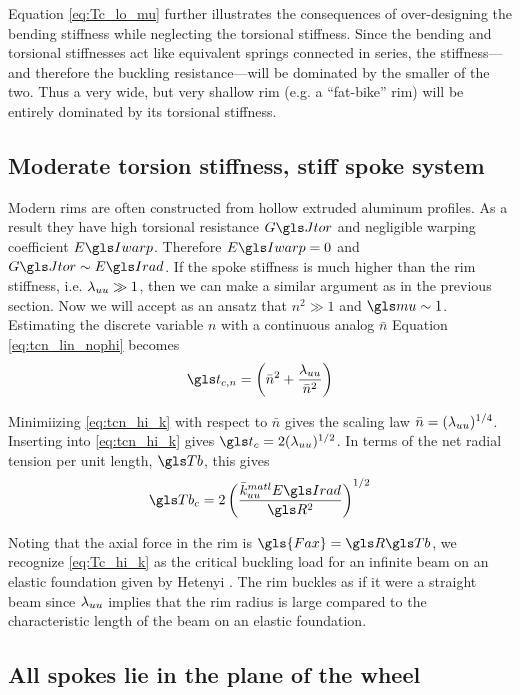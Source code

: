 \documentclass[\rootdir/thesis.tex]{subfiles}
\begin{document}
Equation \eqref{eq:Tc_lo_mu} further illustrates the consequences of over-designing the bending stiffness while neglecting the torsional stiffness. Since the bending and torsional stiffnesses act like equivalent springs connected in series, the stiffness---and therefore the buckling resistance---will be dominated by the smaller of the two. Thus a very wide, but very shallow rim (e.g. a ``fat-bike'' rim) will be entirely dominated by its torsional stiffness.

\subsection{Moderate torsion stiffness, stiff spoke system}
Modern rims are often constructed from hollow extruded aluminum profiles. As a result they have high torsional resistance $\GJ$ and negligible warping coefficient $\EIw$. Therefore $\EIw=0$ and $\GJ \sim \EIr$. If the spoke stiffness is much higher than the rim stiffness, i.e. $\lambda_{uu} \gg 1$, then we can make a similar argument as in the previous section. Now we will accept as an ansatz that $n^2 \gg 1$ and $\m \sim 1$. Estimating the discrete variable $n$ with a continuous analog $\bar{n}$ Equation \eqref{eq:tcn_lin_nophi} becomes
\begin{equation}
\label{eq:tcn_hi_k}
\ts_{c,n} = \left(\bar{n}^2 + \frac{\lr_{uu}}{\bar{n}^2}\right)
\end{equation}

Minimiizing \eqref{eq:tcn_hi_k} with respect to $\bar{n}$ gives the scaling law $\bar{n}=(\lambda_{uu})^{1/4}$. Inserting into \eqref{eq:tcn_hi_k} gives $\ts_c = 2(\lr_{uu})^{1/2}$. In terms of the net radial tension per unit length, $\Tb$, this gives
\begin{equation}
\label{eq:Tc_hi_k}
\Tb_c = 2 \left(\frac{\matl{\kuu}\EIr}{\R^2}\right)^{1/2}
\end{equation}

Noting that the axial force in the rim is $\gls{Fax}=\R\Tb$, we recognize \eqref{eq:Tc_hi_k} as the critical buckling load for an infinite beam on an elastic foundation given by Hetenyi \cite{Hetenyi1946}. The rim buckles as if it were a straight beam since $\lambda_{uu}$ implies that the rim radius is large compared to the characteristic length of the beam on an elastic foundation.

\subsection{All spokes lie in the plane of the wheel}
\end{document}

